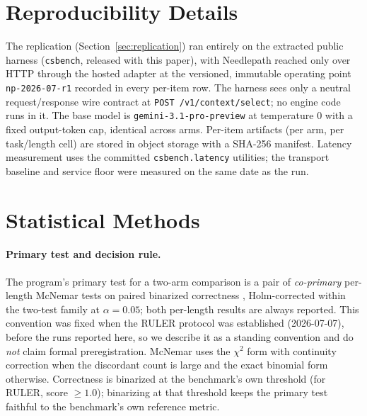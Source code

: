 \documentclass[11pt]{article}
\newcommand{\NP}{Needlepath}
\newcommand{\oppoint}{\texttt{np-2026-07-r1}}
\newcommand{\wire}{\texttt{POST /v1/context/select}}
\begin{document}
\section{Reproducibility Details}
\label{app:repro}

The replication (Section~\ref{sec:replication}) ran entirely on the extracted public harness
(\texttt{csbench}, released with this paper), with \NP{} reached only over HTTP through the hosted
adapter at the versioned, immutable operating point \oppoint{} recorded in every per-item row. The
harness sees only a neutral request/response wire contract at \wire{}; no engine code runs in it.
The base model is \texttt{gemini-3.1-pro-preview} at temperature $0$ with a fixed output-token cap,
identical across arms. Per-item artifacts (per arm, per task/length cell) are stored in object
storage with a SHA-256 manifest. Latency measurement uses the committed \texttt{csbench.latency}
utilities; the transport baseline and service floor were measured on the same date as the run.

\section{Statistical Methods}
\label{app:stats}

\paragraph{Primary test and decision rule.} The program's primary test for a two-arm comparison is a
pair of \emph{co-primary} per-length McNemar tests on paired binarized correctness
\citep{mcnemar1947}, Holm-corrected within the two-test family at $\alpha{=}0.05$; both per-length
results are always reported. This convention was fixed when the RULER protocol was established
(2026-07-07), before the runs reported here, so we describe it as a standing convention and do
\emph{not} claim formal preregistration. McNemar uses the $\chi^2$ form with continuity correction
when the discordant count is large and the exact binomial form otherwise. Correctness is binarized
at the benchmark's own threshold (for RULER, score $\ge 1.0$); binarizing at that
threshold keeps the primary test faithful to the benchmark's own reference metric.
\end{document}
